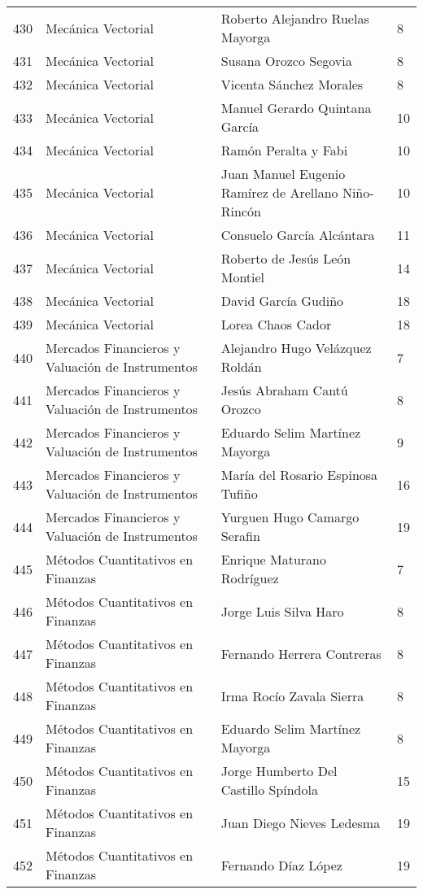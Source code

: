 \begin{table}[ht]
\begin{tabular}{rlll}
  430 & Mecánica Vectorial & Roberto Alejandro Ruelas Mayorga & 8 \\ 
  431 & Mecánica Vectorial & Susana Orozco Segovia & 8 \\ 
  432 & Mecánica Vectorial & Vicenta Sánchez Morales & 8 \\ 
  433 & Mecánica Vectorial & Manuel Gerardo Quintana García & 10 \\ 
  434 & Mecánica Vectorial & Ramón Peralta y Fabi & 10 \\ 
  435 & Mecánica Vectorial & Juan Manuel Eugenio Ramírez de Arellano Niño-Rincón & 10 \\ 
  436 & Mecánica Vectorial & Consuelo García Alcántara & 11 \\ 
  437 & Mecánica Vectorial & Roberto de Jesús León Montiel & 14 \\ 
  438 & Mecánica Vectorial & David García Gudiño & 18 \\ 
  439 & Mecánica Vectorial & Lorea Chaos Cador & 18 \\ 
  440 & Mercados Financieros y Valuación de Instrumentos & Alejandro Hugo Velázquez Roldán & 7 \\ 
  441 & Mercados Financieros y Valuación de Instrumentos & Jesús Abraham Cantú Orozco & 8 \\ 
  442 & Mercados Financieros y Valuación de Instrumentos & Eduardo Selim Martínez Mayorga & 9 \\ 
  443 & Mercados Financieros y Valuación de Instrumentos & María del Rosario Espinosa Tufiño & 16 \\ 
  444 & Mercados Financieros y Valuación de Instrumentos & Yurguen Hugo Camargo Serafin & 19 \\ 
  445 & Métodos Cuantitativos en Finanzas & Enrique Maturano Rodríguez & 7 \\ 
  446 & Métodos Cuantitativos en Finanzas & Jorge Luis Silva Haro & 8 \\ 
  447 & Métodos Cuantitativos en Finanzas & Fernando Herrera Contreras & 8 \\ 
  448 & Métodos Cuantitativos en Finanzas & Irma Rocío Zavala Sierra & 8 \\ 
  449 & Métodos Cuantitativos en Finanzas & Eduardo Selim Martínez Mayorga & 8 \\ 
  450 & Métodos Cuantitativos en Finanzas & Jorge Humberto Del Castillo Spíndola & 15 \\ 
  451 & Métodos Cuantitativos en Finanzas & Juan Diego Nieves Ledesma & 19 \\ 
  452 & Métodos Cuantitativos en Finanzas & Fernando Díaz López & 19 \\ 

\end{tabular}
\end{table}
